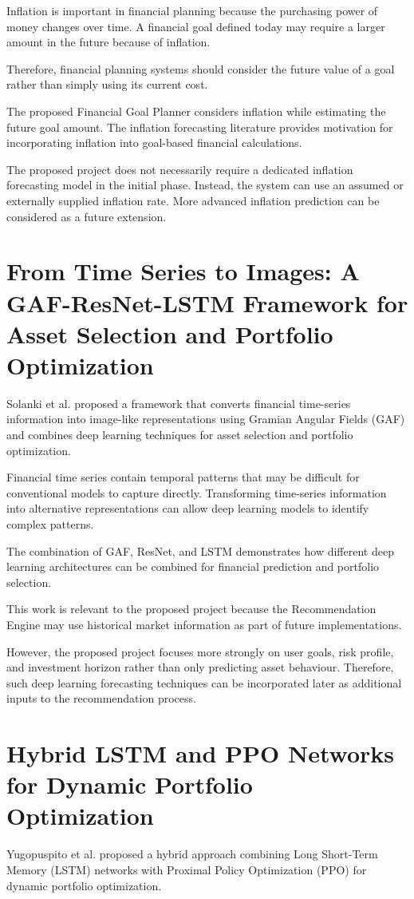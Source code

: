 Inflation is important in financial planning because the purchasing power of money changes over time. A financial goal defined today may require a larger amount in the future because of inflation.

Therefore, financial planning systems should consider the future value of a goal rather than simply using its current cost.

The proposed Financial Goal Planner considers inflation while estimating the future goal amount. The inflation forecasting literature provides motivation for incorporating inflation into goal-based financial calculations.

The proposed project does not necessarily require a dedicated inflation forecasting model in the initial phase. Instead, the system can use an assumed or externally supplied inflation rate. More advanced inflation prediction can be considered as a future extension.

\section{From Time Series to Images: A GAF-ResNet-LSTM Framework for Asset Selection and Portfolio Optimization}
Solanki et al. proposed a framework that converts financial time-series information into image-like representations using Gramian Angular Fields (GAF) and combines deep learning techniques for asset selection and portfolio optimization.

Financial time series contain temporal patterns that may be difficult for conventional models to capture directly. Transforming time-series information into alternative representations can allow deep learning models to identify complex patterns.

The combination of GAF, ResNet, and LSTM demonstrates how different deep learning architectures can be combined for financial prediction and portfolio selection.

This work is relevant to the proposed project because the Recommendation Engine may use historical market information as part of future implementations.

However, the proposed project focuses more strongly on user goals, risk profile, and investment horizon rather than only predicting asset behaviour. Therefore, such deep learning forecasting techniques can be incorporated later as additional inputs to the recommendation process.

\section{Hybrid LSTM and PPO Networks for Dynamic Portfolio Optimization}
Yugopuspito et al. proposed a hybrid approach combining Long Short-Term Memory (LSTM) networks with Proximal Policy Optimization (PPO) for dynamic portfolio optimization.

